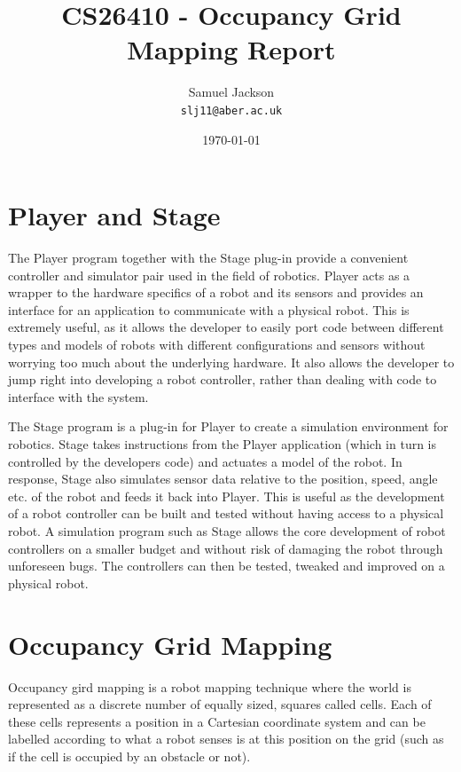 \documentclass{article}
\begin{document}
\title{CS26410 - Occupancy Grid Mapping Report}
\author{Samuel Jackson \\ \texttt{slj11@aber.ac.uk}}
\date{\today}
\maketitle


\section{Player and Stage}
The Player program together with the Stage plug-in provide a convenient controller and simulator pair used in the field of robotics. Player acts as a wrapper to the hardware specifics of a robot and its sensors and provides an interface for an application to communicate with a physical robot. This is extremely useful, as it allows the developer to easily port code between different types and models of robots with different configurations and sensors without worrying too much about the underlying hardware. It also allows the developer to jump right into developing a robot controller, rather than dealing with code to interface with the system.

The Stage program is a plug-in for Player to create a simulation environment for robotics. Stage takes instructions from the Player application (which in turn is controlled by the developers code) and actuates a model of the robot. In response, Stage also simulates sensor data relative to the position, speed, angle etc. of the robot and feeds it back into Player. This is useful as the development of a robot controller can be built and tested without having access to a physical robot. A simulation program such as Stage allows the core development of robot controllers on a smaller budget and without risk of damaging the robot through unforeseen bugs. The controllers can then be tested, tweaked and improved on a physical robot.

\section{Occupancy Grid Mapping}
Occupancy gird mapping is a robot mapping technique where the world is represented as a discrete number of equally sized, squares called cells. Each of these cells represents a position in a Cartesian coordinate system and can be labelled according to what a robot senses is at this position on the grid (such as if the cell is occupied by an obstacle or not).
\end{document}

